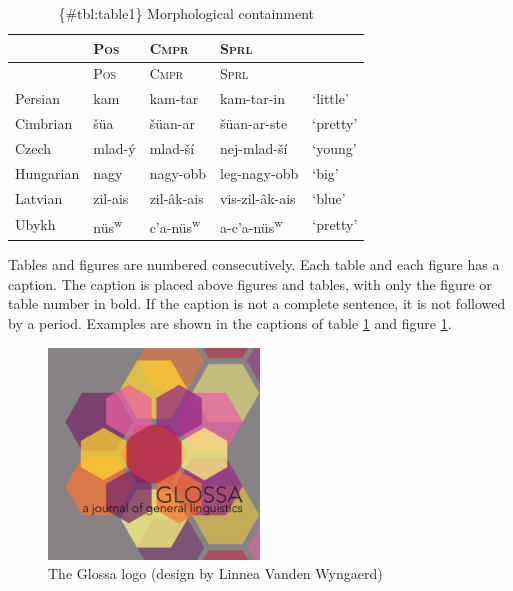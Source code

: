 \documentclass[cm,linguex]{glossa}
\begin{document}
\begin{longtable}[]{@{}lllll@{}}
\caption{\{\#tbl:table1\} Morphological containment}\tabularnewline
\toprule\noalign{}
& \textsc{Pos} & \textsc{Cmpr} & \textsc{Sprl} & \\
\midrule\noalign{}
\endfirsthead
\toprule\noalign{}
& \textsc{Pos} & \textsc{Cmpr} & \textsc{Sprl} & \\
\midrule\noalign{}
\endhead
\bottomrule\noalign{}
\endlastfoot
Persian & kam & kam-tar & kam-tar-in & `little' \\
Cimbrian & šüa & šüan-ar & šüan-ar-ste & `pretty' \\
Czech & mlad-ý & mlad-ší & nej-mlad-ší & `young' \\
Hungarian & nagy & nagy-obb & leg-nagy-obb & `big' \\
Latvian & zil-ais & zil-âk-ais & vis-zil-âk-ais & `blue' \\
Ubykh & nüs\textsuperscript{w} & c'a-nüs\textsuperscript{w} &
a-c'a-nüs\textsuperscript{w} & `pretty' \\
\end{longtable}

Tables and figures are numbered consecutively. Each table and each
figure has a caption. The caption is placed above figures and tables,
with only the figure or table number in bold. If the caption is not a
complete sentence, it is not followed by a period. Examples are shown in
the captions of table \protect\hyperlink{tbl:table1}{1} and figure
\protect\hyperlink{fig:glossalogo}{1}.

\begin{figure}

{\centering \includegraphics[width=0.5\textwidth]{glossa} 

}

\caption{The Glossa logo (design by Linnea Vanden Wyngaerd)}\label{fig:fig-glossa}
\end{figure}
\end{document}
